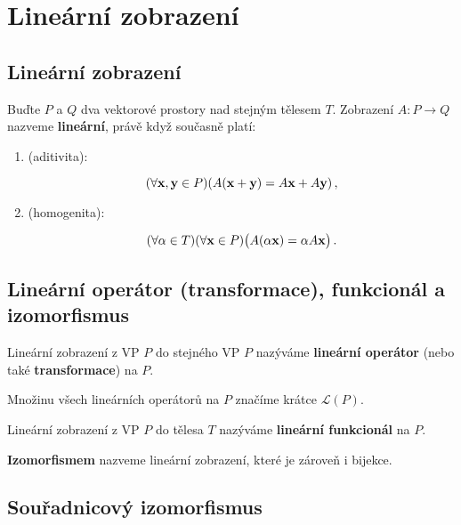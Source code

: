 \section{Lineární zobrazení}

\subsection*{Lineární zobrazení}

Buďte $P$ a $Q$ dva vektorové prostory nad stejným tělesem $T$. Zobrazení
$A:P\rightarrow Q$ nazveme \textbf{lineární}, právě když současně platí:

\begin{enumerate}
      \item (aditivita):

            \begin{equation*}
                  (\forall \mathbf{x},\mathbf{y}\in P)( A(\mathbf{x}+\mathbf{y})=A\mathbf{x}+A\mathbf{y})\,,
            \end{equation*}
      \item (homogenita):

            \begin{equation*}
                  (\forall \alpha\in T)( \forall \mathbf{x} \in P) \big(A(\alpha \mathbf{x})=\alpha A\mathbf{x}\big)\,.
            \end{equation*}
\end{enumerate}

\subsection*{Lineární operátor (transformace), funkcionál a izomorfismus}

Lineární zobrazení z VP $P$ do stejného VP $P$ nazýváme \textbf{lineární
      operátor} (nebo také \textbf{transformace}) na $P$.

\vspace{0.5em}

\noindent Množinu všech lineárních operátorů na $P$ značíme krátce $\mathcal L(P)$.

\vspace{0.5em}

\noindent Lineární zobrazení z VP $P$ do tělesa $T$ nazýváme \textbf{lineární funkcionál} na $P$.

\vspace{0.5em}

\noindent \textbf{Izomorfismem} nazveme lineární zobrazení, které je zároveň i bijekce.

\subsection*{Souřadnicový izomorfismus}

